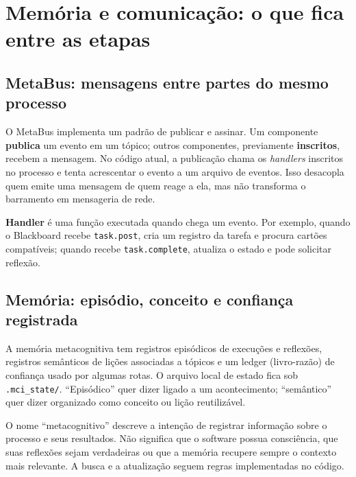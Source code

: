 \section{Memória e comunicação: o que fica entre as etapas}

\subsection{MetaBus: mensagens entre partes do mesmo processo}

\begin{descricao}
O MetaBus implementa um padrão de publicar e assinar. Um componente
\textbf{publica} um evento em um tópico; outros componentes, previamente
\textbf{inscritos}, recebem a mensagem. No código atual, a publicação chama os
\emph{handlers} inscritos no processo e tenta acrescentar o evento a um arquivo
de eventos. Isso desacopla quem emite uma mensagem de quem reage a ela, mas não
transforma o barramento em mensageria de rede.
\end{descricao}

\begin{conceito}
\textbf{Handler} é uma função executada quando chega um evento. Por exemplo,
quando o Blackboard recebe \texttt{task.post}, cria um registro da tarefa e
procura cartões compatíveis; quando recebe \texttt{task.complete}, atualiza o
estado e pode solicitar reflexão.
\end{conceito}

\subsection{Memória: episódio, conceito e confiança registrada}

\begin{descricao}
A memória metacognitiva tem registros episódicos de execuções e reflexões,
registros semânticos de lições associadas a tópicos e um ledger (livro-razão) de
confiança usado por algumas rotas. O arquivo local de estado fica sob
\texttt{.mci\_state/}. ``Episódico'' quer dizer ligado a um acontecimento;
``semântico'' quer dizer organizado como conceito ou lição reutilizável.
\end{descricao}

\begin{limite}
O nome ``metacognitivo'' descreve a intenção de registrar informação sobre o
processo e seus resultados. Não significa que o software possua consciência,
que suas reflexões sejam verdadeiras ou que a memória recupere sempre o contexto
mais relevante. A busca e a atualização seguem regras implementadas no código.
\end{limite}

